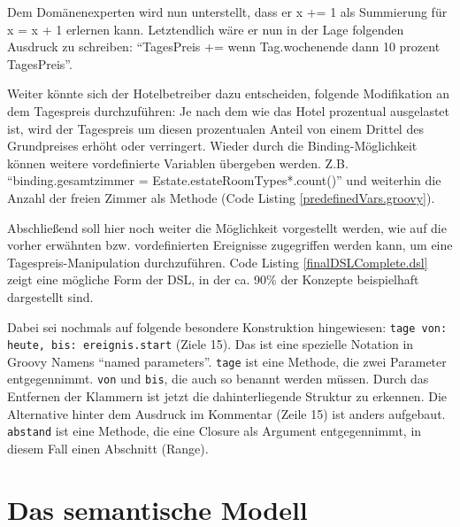 \documentclass[11pt,english,ngerman, headsepline]{scrreprt}
\begin{document}

 
Dem Domänenexperten wird nun unterstellt, dass er x += 1 als Summierung für x =
x + 1 erlernen kann. Letztendlich wäre er nun in der Lage folgenden Ausdruck zu
schreiben: ``TagesPreis += wenn Tag.wochenende dann 10 prozent TagesPreis''.
 
Weiter könnte sich der Hotelbetreiber dazu entscheiden, folgende Modifikation an
dem Tagespreis durchzuführen: Je nach dem wie das Hotel prozentual ausgelastet
ist, wird der Tagespreis um diesen prozentualen Anteil von einem Drittel des
Grundpreises erhöht oder verringert.
Wieder durch die Binding-Möglichkeit können weitere vordefinierte Variablen
übergeben werden. Z.B. ``binding.gesamtzimmer =
Estate.estateRoomTypes*.count()'' und weiterhin die Anzahl der freien
Zimmer als Methode (Code Listing \ref{predefinedVars.groovy}).


 
Abschließend soll hier noch weiter die Möglichkeit vorgestellt werden, wie auf
die vorher erwähnten bzw. vordefinierten Ereignisse zugegriffen werden kann, um
eine Tagespreis-Manipulation durchzuführen.
Code Listing \ref{finalDSLComplete.dsl} zeigt eine mögliche Form der DSL, in der
ca. 90\% der Konzepte beispielhaft dargestellt sind.  


 
Dabei sei nochmals auf folgende besondere Konstruktion hingewiesen: \texttt{tage
von:
heute, bis: ereignis.start} (Ziele 15). Das ist eine spezielle Notation in
Groovy Namens ``named parameters''. \texttt{tage} ist eine Methode, die zwei
Parameter entgegennimmt.
\texttt{von} und \texttt{bis}, die auch so benannt werden müssen. Durch das
Entfernen der Klammern ist jetzt die dahinterliegende Struktur zu erkennen. Die
Alternative hinter dem Ausdruck im Kommentar (Zeile 15) ist anders aufgebaut.
\texttt{abstand} ist eine Methode, die eine Closure als Argument entgegennimmt,
in diesem Fall einen Abschnitt (Range).

\section{Das semantische Modell}
\end{document}
